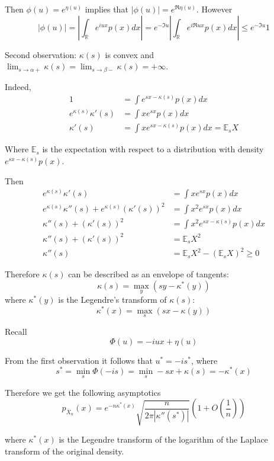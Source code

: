 \documentclass[a4paper]{article}
\newcommand{\brac}[1]{{\left ( #1 \right )}}
\newcommand{\abs}[1]{{\left | #1 \right |}}
\newcommand{\Real}{\mathbb{R}}
\newcommand{\Ex}{\mathbb{E}}
\begin{document}
Then $\phi(u) = e^{\eta(u)}$ implies that $\abs{\phi(u)} = e^{\Re \eta(u)}$. However 
\[\abs{\phi(u)} = \abs{\int_\Real e^{iux} p(x) dx} = e^{-\Im u} \abs{ \int_\Real e^{i\Re u x} p(x) dx } \leq e^{-\Im u} 1 \]

Second observation: $\kappa(s)$ is convex and $\lim_{s\to \alpha+} \kappa(s) = \lim_{s\to \beta-} \kappa(s) = +\infty$.

Indeed, 
\begin{align*}
	1 &= \int e^{sx - \kappa(s)} p(x) dx \\
	e^{\kappa(s)} \kappa'(s) &= \int xe^{sx} p(x) dx \\
	\kappa'(s) &= \int xe^{sx - \kappa(s)} p(x) dx = \Ex_s X
\end{align*}

Where $\Ex_s$ is the expectation with respect to a distribution with density $e^{sx - \kappa(s)} p(x)$.

Then
\begin{align*}
	e^{\kappa(s)} \kappa'(s) &= \int xe^{sx} p(x) dx \\
	e^{\kappa(s)} \kappa''(s) + e^{\kappa(s)} \brac{\kappa'(s)}^2 &= \int x^2 e^{sx} p(x) dx \\
	\kappa''(s) + \brac{\kappa'(s)}^2 &= \int x^2 e^{sx-\kappa(s)} p(x) dx \\
	\kappa''(s) + \brac{\kappa'(s)}^2 &= \Ex_s X^2 \\
	\kappa''(s) &= \Ex_s X^2 - \brac{\Ex_s X}^2\geq 0
\end{align*}

Therefore $\kappa(s)$ can be described as an envelope of tangents:
\[ \kappa(s) = \max_{y} \brac{sy - \kappa^*(y)} \]
where $\kappa^*(y)$ is the Legendre's transform of $\kappa(s)$:
\[ \kappa^*(x) = \max_{s} \brac{sx - \kappa(y)} \]

Recall 
\[\Phi(u) = - iux +\eta(u)\]

From the first observation it follows that $u^* = -is^*$, where
\[s^* = \min_{s}\Phi(-is) = \min_{s} -sx + \kappa(s) = - \kappa^*(x)\]

Therefore we get the following asymptotics
\[p_{\bar{X}_n}(x) = e^{-n\kappa^*(x)} \sqrt{\frac{n}{2\pi \abs{\kappa''(s^*)}}}\brac{1+O(\frac{1}{n})}\]

where $\kappa^*(x)$ is the Legendre transform of the logarithm of the Laplace transform of the original density.


\end{document}

